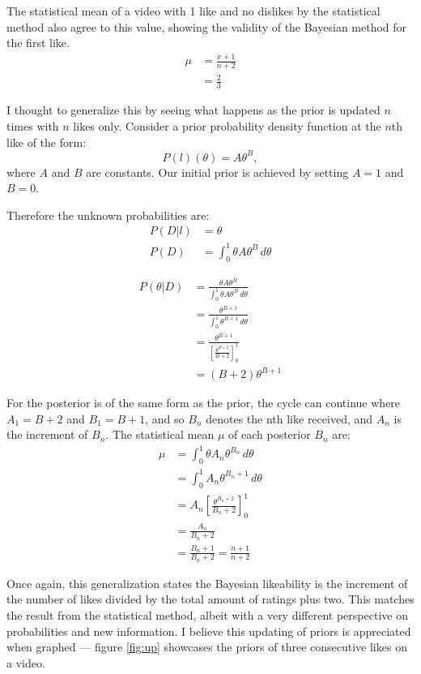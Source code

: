 \documentclass[a4paper,11pt]{article}
\begin{document}
The statistical mean of a video with 1 like and no dislikes by the statistical method also agree to this value, showing the validity of the Bayesian method for the first like.
\begin{align*}
    \mu &= \frac{x+1}{n+2}\\
        &= \frac{2}{3}
\end{align*}

I thought to generalize this by seeing what happens as the prior is updated $n$ times with $n$ likes only. Consider a prior probability density function at the $n$th like of the form:
\[
    P(l)(\theta) = A \theta^B,
\]
where $A$ and $B$ are constants. Our initial prior is achieved by setting $A=1$ and $B=0$.

Therefore the unknown probabilities are:
\begin{align*}
    P(D|l) &= \theta\\
    P(D) &= \int_0^1 \theta A\theta^B \, d\theta
\end{align*}

\begin{align*}
    P(\theta|D) &= \frac{\theta A\theta^B}{\int_0^1 \theta A\theta^B \, d\theta}\\
    &= \frac{\theta^{B+1}}{\int_0^1 \theta^{B+1} \, d\theta}\\
    &= \frac{\theta^{B+1}}{[\frac{\theta^{B+2}}{B+2}]^1_0}\\
    &= (B+2) \theta^{B+1}
\end{align*}

For the posterior is of the same form as the prior, the cycle can continue where $A_1 = B+2$ and $B_1 = B+1$, and so $B_n$ denotes the nth like received, and $A_n$ is the increment of $B_n$. The statistical mean $\mu$ of each posterior $B_n$ are:
\begin{align*}
    \mu &= \int_0^1 \theta A_n \theta^{B_n} \, d\theta\\
    &= \int_0^1 A_n \theta^{B_n + 1} \, d\theta\\
    &= A_n [\frac{\theta^{B_n+2}}{B_n+2}]^1_0\\
    &= \frac{A_n}{B_n+2}\\
    &= \frac{B_n+1}{B_n+2} = \frac{n+1}{n+2}
\end{align*}

Once again, this generalization states the Bayesian likeability is the increment of the number of likes divided by the total amount of ratings plus two. This matches the result from the statistical method, albeit with a very different perspective on probabilities and new information. I believe this updating of priors is appreciated when graphed --- figure \ref{fig:up} showcases the priors of three consecutive likes on a video.
\end{document}

